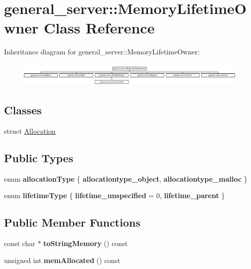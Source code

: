 \hypertarget{classgeneral__server_1_1MemoryLifetimeOwner}{\section{general\-\_\-server\-:\-:\-Memory\-Lifetime\-Owner \-Class \-Reference}
\label{classgeneral__server_1_1MemoryLifetimeOwner}
}
\-Inheritance diagram for general\-\_\-server\-:\-:\-Memory\-Lifetime\-Owner\-:\begin{figure}[H]
\begin{center}
\leavevmode
\includegraphics[height=1.166667cm]{classgeneral__server_1_1MemoryLifetimeOwner}
\end{center}
\end{figure}
\subsection*{\-Classes}
\begin{DoxyCompactItemize}
\item 
struct \hyperlink{structgeneral__server_1_1MemoryLifetimeOwner_1_1Allocation}{\-Allocation}
\end{DoxyCompactItemize}
\subsection*{\-Public \-Types}
\begin{DoxyCompactItemize}
\item 
enum {\bfseries allocation\-Type} \{ {\bfseries allocationtype\-\_\-object}, 
{\bfseries allocationtype\-\_\-malloc}
 \}
\item 
enum {\bfseries lifetime\-Type} \{ {\bfseries lifetime\-\_\-unspecified} =  0, 
{\bfseries lifetime\-\_\-parent}
 \}
\end{DoxyCompactItemize}
\subsection*{\-Public \-Member \-Functions}
\begin{DoxyCompactItemize}
\item 
\hypertarget{classgeneral__server_1_1MemoryLifetimeOwner_ad277e469bf212a35e3ff2b0bac95a108}{const char $\ast$ {\bfseries to\-String\-Memory} () const }\label{classgeneral__server_1_1MemoryLifetimeOwner_ad277e469bf212a35e3ff2b0bac95a108}

\item 
\hypertarget{classgeneral__server_1_1MemoryLifetimeOwner_a59d4c2ea99fd1116e27ebc97b9c34319}{unsigned int {\bfseries mem\-Allocated} () const }\label{classgeneral__server_1_1MemoryLifetimeOwner_a59d4c2ea99fd1116e27ebc97b9c34319}

\end{DoxyCompactItemize}
